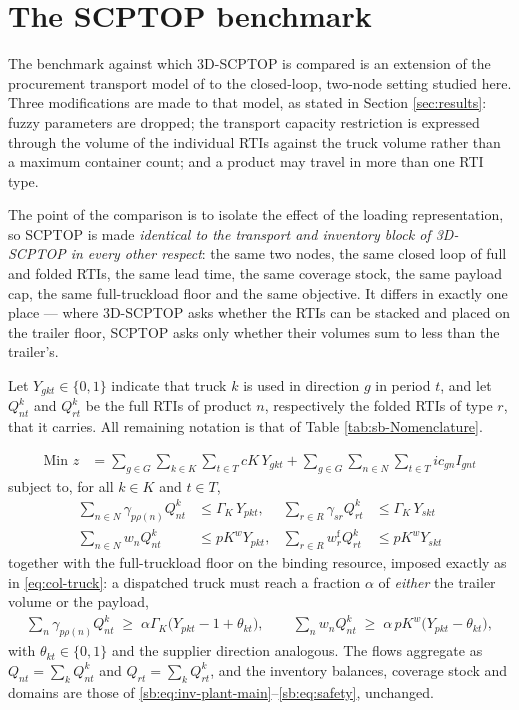 \begingroup\color{blue}
\section{The SCPTOP benchmark}
\label{appendix:A}

The benchmark against which 3D-SCPTOP is compared is an extension of the
procurement transport model of \autocite{Diaz-Madronero2014APlanning} to the
closed-loop, two-node setting studied here. Three modifications are made to
that model, as stated in Section \ref{sec:results}: fuzzy parameters are
dropped; the transport capacity restriction is expressed through the volume of
the individual RTIs against the truck volume rather than a maximum container
count; and a product may travel in more than one RTI type.

The point of the comparison is to isolate the effect of the loading
representation, so SCPTOP is made \emph{identical to the transport and
inventory block of 3D-SCPTOP in every other respect}: the same two nodes, the
same closed loop of full and folded RTIs, the same lead time, the same coverage
stock, the same payload cap, the same full-truckload floor and the same
objective. It differs in exactly one place --- where 3D-SCPTOP asks whether the
RTIs can be stacked and placed on the trailer floor, SCPTOP asks only whether
their volumes sum to less than the trailer's.

Let $Y_{gkt}\in\{0,1\}$ indicate that truck $k$ is used in direction $g$ in
period $t$, and let $Q^{k}_{nt}$ and $Q^{k}_{rt}$ be the full RTIs of product
$n$, respectively the folded RTIs of type $r$, that it carries. All remaining
notation is that of Table \ref{tab:sb-Nomenclature}.

\begin{align}
\text{Min } z
&= \sum_{g\in G}\sum_{k\in K}\sum_{t\in T} cK\,Y_{gkt}
 + \sum_{g\in G}\sum_{n\in N}\sum_{t\in T} ic_{gn}I_{gnt}
 \label{eq:A-obj}
\end{align}
subject to, for all $k\in K$ and $t\in T$,
\begin{align}
\sum_{n\in N}\gamma_{p\rho(n)}Q^{k}_{nt} &\le \Gamma_{K}\,Y_{pkt},
 & \sum_{r\in R}\gamma_{sr}Q^{k}_{rt} &\le \Gamma_{K}\,Y_{skt}
 \label{eq:A-vol}\\
\sum_{n\in N}w_{n}Q^{k}_{nt} &\le pK^{w}Y_{pkt},
 & \sum_{r\in R}w^{\mathrm{f}}_{r}Q^{k}_{rt} &\le pK^{w}Y_{skt}
 \label{eq:A-weight}
\end{align}
together with the full-truckload floor on the binding resource, imposed exactly
as in \eqref{eq:col-truck}: a dispatched truck must reach a fraction $\alpha$
of \emph{either} the trailer volume or the payload,
\begin{align}
\sum_{n}\gamma_{p\rho(n)}Q^{k}_{nt} \;\ge\; \alpha\Gamma_{K}\bigl(Y_{pkt}-1+\theta_{kt}\bigr),
\qquad
\sum_{n}w_{n}Q^{k}_{nt} \;\ge\; \alpha\,pK^{w}\bigl(Y_{pkt}-\theta_{kt}\bigr),
\label{eq:A-ftl}
\end{align}
with $\theta_{kt}\in\{0,1\}$ and the supplier direction analogous. The flows
aggregate as $Q_{nt}=\sum_{k}Q^{k}_{nt}$ and $Q_{rt}=\sum_{k}Q^{k}_{rt}$, and
the inventory balances, coverage stock and domains are those of
\eqref{sb:eq:inv-plant-main}--\eqref{sb:eq:safety}, unchanged.

